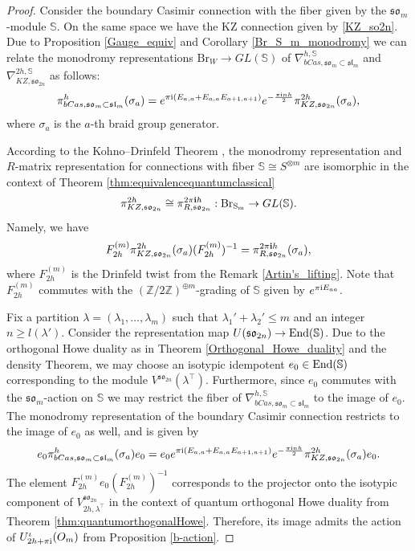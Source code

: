 \documentclass[10pt]{amsart}
\numberwithin{equation}{section}
\theoremstyle{definition}
\newcommand{\End}{{\rm End}}
\newcommand{\slm}{\mathfrak{sl}_{m}}
\newcommand{\son}[1][2n]{\mathfrak{so}_{#1}}
\newcommand{\som}[1][m]{\mathfrak{so}_{#1}}
\newcommand{\Br}{\mathrm{Br}}
\newcommand{\howespin}{\boldsymbol{\mathbb{S}}}
\begin{document}
\begin{proof}
   Consider the boundary Casimir connection with the fiber given by the $\som$-module $\mathbb{S}$. On the same space we have the KZ connection given by \eqref{KZ_so2n}. Due to Proposition \ref{Gauge_equiv} and Corollary \ref{Br_S_m_monodromy} we can relate the monodromy representations $\Br_W\rightarrow GL(\howespin)$ of $\nabla^{h,\howespin}_{bCas, \som \subset \slm}$ and $\nabla^{2h,\howespin}_{KZ,\son}$ as follows:
    \begin{equation}
        \pi^h_{bCas, \som \subset \slm}(\sigma_a)=e^{\pi {\rm i}(E_{a,a}+E_{a,a}E_{a+1,a+1})}e^{-\frac{\pi {\rm i}nh}{2}}\pi^{2h}_{KZ,\son}(\sigma_a),
    \end{equation}
    where $\sigma_a$ is the $a$-th braid group generator. 

    According to the Kohno--Drinfeld Theorem \cite{Drinfeld2,Koh1}, the monodromy representation and $R$-matrix representation for connections with fiber $\howespin\cong S^{\otimes m}$ are isomorphic in the context of Theorem \ref{thm:equivalencequantumclassical}
    \[
    \pi^{2h}_{KZ,\son} \cong \pi^{2\pi {\bf i}h}_{R, \son}:\Br_{\mathrm{S_m}}\rightarrow GL(\howespin).
    \]
    Namely, we have
    \begin{equation}
        F^{(m)}_{2h}\pi^{2h}_{KZ,\son}(\sigma_a) (F^{(m)}_{2h})^{-1} = \pi^{2\pi {\bf i}h}_{R, \son} (\sigma_a),
    \end{equation}
    where $F^{(m)}_{2h}$ is the Drinfeld twist from the Remark \ref{Artin's_lifting}. Note that $F^{(m)}_{2h}$ commutes with the $(\mathbb{Z}/2\mathbb{Z})^{\oplus m}$-grading of $\mathbb{S}$ given by $e^{\pi {\rm i}E_{aa}}$.

        Fix a partition $\lambda = (\lambda_1, \dots, \lambda_m)$ such that $\lambda_1'+\lambda_2'\le m$ and an integer $n\ge l(\lambda')$. Consider the representation map $U(\son)\rightarrow \End(\mathbb{S})$. Due to the orthogonal Howe duality as in Theorem \ref{Orthogonal_Howe_duality} and the density Theorem, we may choose an isotypic idempotent $e_0\in \End(\mathbb{S})$ corresponding to the module $V^{\son}(\lambda^{\top})$. Furthermore, since $e_0$ commutes with the $\som$-action on $\mathbb{S}$ we may restrict the fiber of $\nabla_{bCas,\som\subset \slm}^{h, \howespin}$ to the image of $e_0$. The monodromy representation of the boundary Casimir connection restricts to the image of $e_0$ as well, and is given by
    \begin{equation}
        e_0\pi^h_{bCas, \som \subset \slm}(\sigma_a) e_0=e_0e^{\pi {\rm i}(E_{a,a}+E_{a,a}E_{a+1,a+1})}e^{-\frac{\pi {\rm i}nh}{2}}\pi^{2h}_{KZ,\son}(\sigma_a)e_0.
    \end{equation}
    The element $F^{(m)}_{2h} e_0 (F^{(m)}_{2h})^{-1}$ corresponds to the projector onto the isotypic component of $V_{2h,\lambda^\top}^{\son}$ in the context of quantum orthogonal Howe duality from Theorem \ref{thm:quantumorthogonalHowe}. Therefore, its image admits the action of $U^{\iota}_{2h+\pi{\rm i}}(O_m)$ from Proposition \ref{b-action}.


\end{proof}
\end{document}
